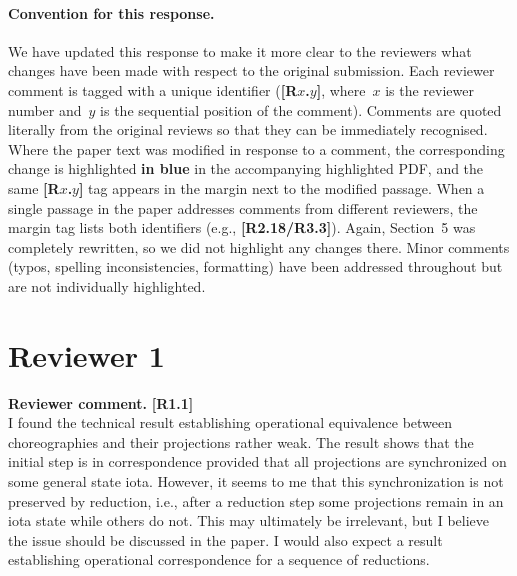 \documentclass[11pt]{article}
\newcommand{\revcomment}[1]{%
  \begin{reviewercomment}
  \textbf{Reviewer comment.} #1
  \end{reviewercomment}
}
\begin{document}
\paragraph{Convention for this response.}
%
We have updated this response to make it more clear to the reviewers
what changes have been made with respect to the original submission.
%
Each reviewer comment is tagged with a unique identifier
(\textbf{[R$x$.$y$]}, where~$x$ is the reviewer number and~$y$ is the
sequential position of the comment). Comments are quoted literally
from the original reviews so that they can be immediately recognised.
Where the paper text was modified in response to a comment, the
corresponding change is highlighted \textbf{in blue} in the
accompanying highlighted PDF, and the same \textbf{[R$x$.$y$]} tag
appears in the margin next to the modified passage. When a single
passage in the paper addresses comments from different reviewers, the
margin tag lists both identifiers (e.g.,
\textbf{[R2.18/R3.3]}). Again, Section~5 was completely rewritten, so we did not highlight
any changes there. Minor comments (typos, spelling inconsistencies,
formatting) have been addressed throughout but are not individually
highlighted.


\newpage

\section*{Reviewer 1}


\revcomment{\textbf{[R1.1]}\\
I found the technical result establishing operational equivalence
between choreographies and their projections rather weak. The result
shows that the initial step is in correspondence provided that all
projections are synchronized on some general state iota. However, it
seems to me that this synchronization is not preserved by reduction,
i.e., after a reduction step some projections remain in an iota
state while others do not. This may ultimately be irrelevant, but I
believe the issue should be discussed in the paper. I would also
expect a result establishing operational correspondence for a
sequence of reductions.
}
\end{document}
